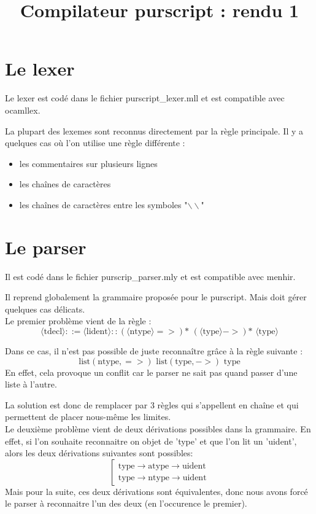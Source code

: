 \documentclass[12pt,a4paper,french]{article}
\title{Compilateur purscript : rendu 1}
\begin{document}
\maketitle

\part*{Le lexer}
Le lexer est codé dans le fichier purscript\_lexer.mll et est compatible avec ocamllex.

La plupart des lexemes sont reconnus directement par la règle principale. Il y a quelques cas où l'on utilise une règle différente :

\begin{itemize}
\item les commentaires sur plusieurs lignes
\item les chaînes de caractères
\item les chaînes de caractères entre les symboles "$\backslash\backslash$"
\end{itemize}


\part*{Le parser}
Il est codé dans le fichier purscrip\_parser.mly et est compatible avec menhir.

Il reprend globalement la grammaire proposée pour le purscript. Mais doit gérer quelques cas délicats. \\

Le premier problème vient de la règle :
\[ \langle\text{tdecl}\rangle ::= \langle \text{lident}\rangle :: (\langle\text{ntype}\rangle =>)\text{* } (\langle\text{type}\rangle ->)\text{* } \langle\text{type}\rangle \]

Dans ce cas, il n'est pas possible de juste reconnaître grâce à la règle suivante :
\[  \text{list}(\text{ntype}, =>) \text{ list}(\text{type}, ->) \text{ type} \]
En effet, cela provoque un conflit car le parser ne sait pas quand passer d'une liste à l'autre.

La solution est donc de remplacer par 3 règles qui s'appellent en chaîne et qui permettent de placer nous-même les limites.
\\
Le deuxième problème vient de deux dérivations possibles dans la grammaire. En effet, si l'on souhaite reconnaitre on objet de 'type' et que l'on lit un 'uident', alors les deux dérivations suivantes sont possibles:
\[ \left[ \begin{array}{l}
	\text{type} \rightarrow \text{atype} \rightarrow \text{uident} \\
	\text{type} \rightarrow \text{ntype} \rightarrow \text{uident}
\end{array} \right.
\]
Mais pour la suite, ces deux dérivations sont équivalentes, donc nous avons forcé le parser à reconnaitre l'un des deux (en l'occurence le premier).
\end{document}
